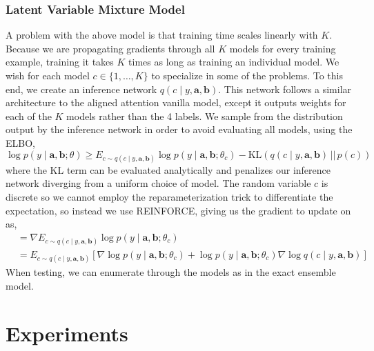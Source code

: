\documentclass[12pt]{article}
\begin{document}
\subsubsection{Latent Variable Mixture Model} %
\label{subsub:latent_variable_mixture_model}

A problem with the above model is that training time scales linearly with $K$.
Because we are propagating gradients through all $K$ models for every training
example, training it takes $K$ times as long as training an individual model.
We wish for each model $c \in \{1, \ldots, K\}$ to specialize in some of the
problems. To this end, we create an inference network $q(c \mid y, \bm{a},
\bm{b})$. This network follows a similar architecture to the aligned attention
vanilla model, except it outputs weights for each of the $K$ models rather than
the 4 labels. We sample from the distribution output by the inference network in
order to avoid evaluating all models, using the ELBO,
\[ \log p(y \mid \bm{a}, \bm{b}; \theta) \ge E_{c \sim q(c \mid y, \bm{a},
\bm{b})} \log p(y \mid \bm{a}, \bm{b}; \theta_c) - \text{KL}(q(c \mid y, \bm{a},
\bm{b})\, ||\, p(c))\]
where the KL term can be evaluated analytically and penalizes our inference
network diverging from a uniform choice of model. The random variable $c$ is
discrete so we cannot employ the reparameterization trick to differentiate the
expectation, so instead we use REINFORCE, giving us the gradient to update on
as,
\begin{align*}
&= \nabla E_{c \sim q(c \mid y, \bm{a}, \bm{b})} \log p(y \mid \bm{a}, \bm{b};
\theta_c) \\
&= E_{c \sim q(c \mid y, \bm{a}, \bm{b})} \left[ \nabla \log p(y \mid
\bm{a}, \bm{b}; \theta_c) + \log p(y \mid \bm{a}, \bm{b}; \theta_c) \nabla \log
q(c \mid y, \bm{a}, \bm{b})\right]
\end{align*}
When testing, we can enumerate through the models as in the exact ensemble
model.

\section{Experiments}
\end{document}
